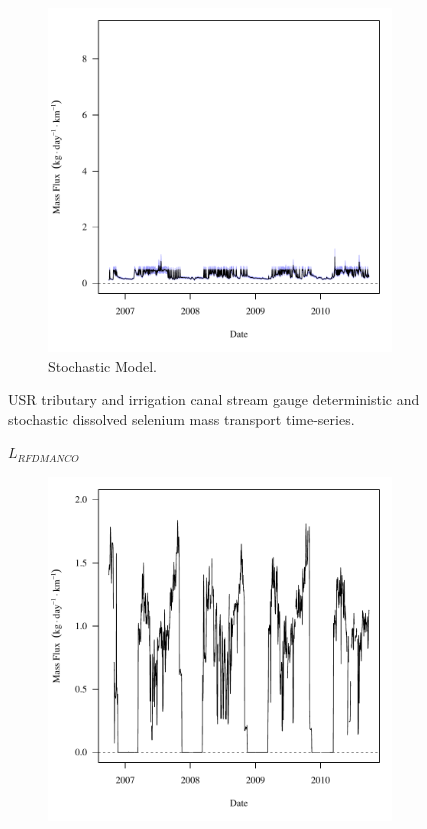\begin{linenumbers}
\begin{landscape}
\begin{figure}
\begin{subfigure}{0.7\textwidth}
			\includegraphics[width=\tableCustomSize]{"Figures/Results_USR/Stochastic/f HRC"}
			\caption{Stochastic Model.}
		\end{subfigure}
		\caption{USR tributary and irrigation canal stream gauge deterministic and stochastic dissolved selenium mass transport time-series.}
	\end{figure}
\end{landscape}
\subfiguremid
\begin{landscape}
	\begin{figure}
		$ \displaystyle L_{RFDMANCO} $
		\begin{subfigure}{0.7\textwidth}
			\centering
			\includegraphics[width=\tableCustomSize]{"Figures/Results_USR/Deterministic/f RFD"}

\end{subfigure}
\end{figure}
\end{landscape}
\end{linenumbers}
